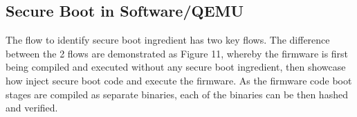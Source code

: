 \documentclass[a4paper,fleqn]{cas-dc}
\begin{document}

\subsection{ Secure Boot in Software/QEMU}
The flow to identify secure boot ingredient has two key flows. The difference between the 2 flows are demonstrated as Figure 11, whereby the firmware is first being compiled and executed without any secure boot ingredient, then showcase how inject secure boot code and execute the firmware. As the firmware code boot stages are compiled as separate binaries, each of the binaries can be then hashed and verified.
\end{document}
